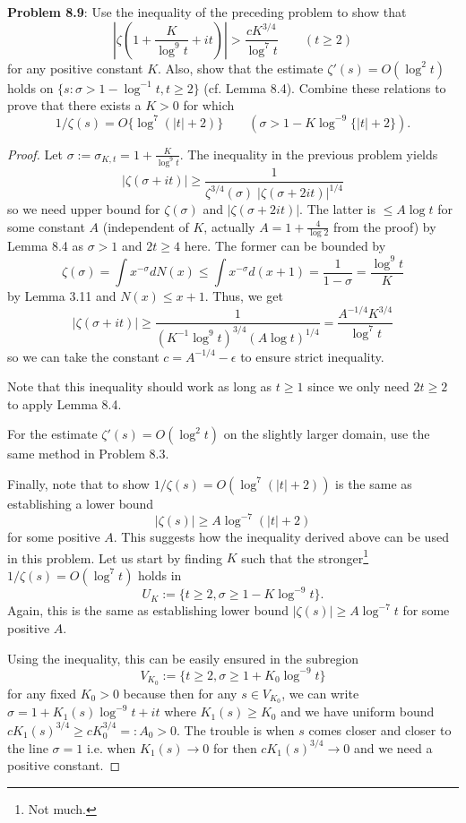 \documentclass[12pt]{article}
\newcommand{\Abs}[1]{\left| #1 \right|}
\begin{document}
\textbf{Problem 8.9}: Use the inequality of the preceding problem to show that
$$\Abs{ \zeta\left( 1 + \frac{K}{\log^9 t} + it \right) } > \frac{c K^{3/4}}{\log^7 t} \qquad (t \geq 2)$$
for any positive constant $K$. Also, show that the estimate $\zeta'(s) = O(\log^2 t)$ holds on $\{s : \sigma > 1 - \log^{-1} t, t \geq 2\}$ (cf. Lemma 8.4). Combine these relations to prove that there exists a $K > 0$ for which
$$1/\zeta(s) = O\{\log^7(|t| + 2)\} \qquad (\sigma > 1 - K \log^{-9}\{|t| + 2\}).$$

\begin{proof}
Let $\sigma := \sigma_{K,t} = 1 + \frac{K}{\log^9 t}$. The inequality in the previous problem yields
$$\Abs{ \zeta\left( \sigma + it \right) } \geq \frac{1}{\zeta^{3/4}(\sigma) \; |\zeta(\sigma + 2it)|^{1/4} }$$
so we need upper bound for $\zeta(\sigma)$ and $|\zeta(\sigma + 2it)|$. The latter is $\leq A \log t$ for some constant $A$ (independent of $K$, actually $A = 1 + \frac{4}{\log 2}$ from the proof) by Lemma 8.4 as $\sigma > 1$ and $2t \geq 4$ here. The former can be bounded by
$$\zeta(\sigma) = \int x^{-\sigma} dN(x) \leq \int x^{-\sigma} d(x + 1) = \frac{1}{1-\sigma} = \frac{\log^9 t}{K}$$
by Lemma 3.11 and $N(x) \leq x + 1$. Thus, we get
$$\Abs{ \zeta\left( \sigma + it \right) } \geq \frac{1}{(K^{-1} \log^9 t)^{3/4} (A \log t)^{1/4}} = \frac{A^{-1/4} K^{3/4}}{\log^7 t}$$
so we can take the constant $c = A^{-1/4} - \epsilon$ to ensure strict inequality.

Note that this inequality should work as long as $t \geq 1$ since we only need $2t \geq 2$ to apply Lemma 8.4.

For the estimate $\zeta'(s) = O(\log^2 t)$ on the slightly larger domain, use the same method in Problem 8.3.

Finally, note that to show $1/\zeta(s) = O(\log^7(|t| + 2))$ is the same as establishing a lower bound
$$|\zeta(s)| \geq A \log^{-7} (|t| + 2)$$
for some positive $A$. This suggests how the inequality derived above can be used in this problem. Let us start by finding $K$ such that the stronger\footnote{Not much.} $1/\zeta(s) = O(\log^7 t)$ holds in
$$U_K := \{ t \geq 2, \sigma \geq 1 - K \log^{-9} t \}.$$
Again, this is the same as establishing lower bound $|\zeta(s)| \geq A \log^{-7} t$ for some positive $A$.

Using the inequality, this can be easily ensured in the subregion
$$V_{K_0} := \{t \geq 2, \sigma \geq 1 + K_0 \log^{-9} t\}$$
for any fixed $K_0 > 0$ because then for any $s \in V_{K_0}$, we can write $\sigma = 1 + K_1(s) \log^{-9} t + i t$ where $K_1(s) \geq K_0$ and we have uniform bound $c K_1(s)^{3/4} \geq c K_0^{3/4} =: A_0 > 0$. The trouble is when $s$ comes closer and closer to the line $\sigma = 1$ i.e. when $K_1(s) \rightarrow 0$ for then $c K_1(s)^{3/4} \rightarrow 0$ and we need a positive constant.


\end{proof}
\end{document}
